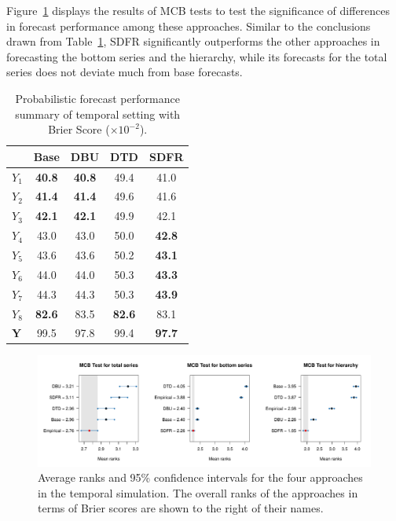 \documentclass[a4paper,review,12pt,authoryear]{elsarticle}
\newcommand{\bY}{\mathbf{Y}}
\theoremstyle{definition}
\begin{document}
     Figure~\ref{fig:sim_temporal_mcb_prob} displays the results of MCB tests to test the significance of differences in forecast performance among these approaches. Similar to the conclusions drawn from Table~\ref{tab:sim_temporal_res_dist}, SDFR significantly outperforms the other approaches in forecasting the bottom series and the hierarchy, while its forecasts for the total series does not deviate much from base forecasts.

     \begin{table}
     \centering
     \caption{\label{tab:sim_temporal_res_dist} Probabilistic forecast performance summary of temporal setting with Brier Score ($\times 10^{-2}$).}
     \begin{tabular}{lcccc}
     \toprule
      & Base & DBU & DTD & SDFR \\\midrule
     $Y_1$ & \textbf{40.8} & \textbf{40.8} & 49.4 & 41.0 \\
     $Y_2$ & \textbf{41.4} & \textbf{41.4} & 49.6 & 41.6\\
     $Y_3$ & \textbf{42.1} & \textbf{42.1} & 49.9 & 42.1\\
     $Y_4$ & 43.0 & 43.0  & 50.0          & \textbf{42.8}\\
     $Y_5$ & 43.6 & 43.6  & 50.2          & \textbf{43.1} \\
     $Y_6$ & 44.0 & 44.0  & 50.3          & \textbf{43.3} \\
     $Y_7$ & 44.3 & 44.3  & 50.3          & \textbf{43.9} \\
     $Y_8$ & \textbf{82.6} & 83.5          & \textbf{82.6} & 83.1\\
     $\bY$ & 99.5 & 97.8  & 99.4          & \textbf{97.7} \\
     \bottomrule
     \end{tabular}
     \end{table}


     \begin{figure}
       \caption{\label{fig:sim_temporal_mcb_prob}Average ranks and 95\% confidence intervals for the four approaches in the temporal simulation. The overall ranks of the approaches in terms of Brier scores are shown to the right of their names.}
       \includegraphics[width=\textwidth]{figures/temporal_mcb.pdf}
     \end{figure}
\end{document}
